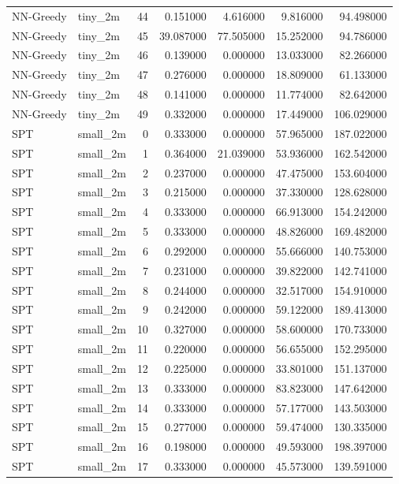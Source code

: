 \begin{tabular}{llrrrrr}
NN-Greedy & tiny_2m & 44 & 0.151000 & 4.616000 & 9.816000 & 94.498000 \\
NN-Greedy & tiny_2m & 45 & 39.087000 & 77.505000 & 15.252000 & 94.786000 \\
NN-Greedy & tiny_2m & 46 & 0.139000 & 0.000000 & 13.033000 & 82.266000 \\
NN-Greedy & tiny_2m & 47 & 0.276000 & 0.000000 & 18.809000 & 61.133000 \\
NN-Greedy & tiny_2m & 48 & 0.141000 & 0.000000 & 11.774000 & 82.642000 \\
NN-Greedy & tiny_2m & 49 & 0.332000 & 0.000000 & 17.449000 & 106.029000 \\
SPT & small_2m & 0 & 0.333000 & 0.000000 & 57.965000 & 187.022000 \\
SPT & small_2m & 1 & 0.364000 & 21.039000 & 53.936000 & 162.542000 \\
SPT & small_2m & 2 & 0.237000 & 0.000000 & 47.475000 & 153.604000 \\
SPT & small_2m & 3 & 0.215000 & 0.000000 & 37.330000 & 128.628000 \\
SPT & small_2m & 4 & 0.333000 & 0.000000 & 66.913000 & 154.242000 \\
SPT & small_2m & 5 & 0.333000 & 0.000000 & 48.826000 & 169.482000 \\
SPT & small_2m & 6 & 0.292000 & 0.000000 & 55.666000 & 140.753000 \\
SPT & small_2m & 7 & 0.231000 & 0.000000 & 39.822000 & 142.741000 \\
SPT & small_2m & 8 & 0.244000 & 0.000000 & 32.517000 & 154.910000 \\
SPT & small_2m & 9 & 0.242000 & 0.000000 & 59.122000 & 189.413000 \\
SPT & small_2m & 10 & 0.327000 & 0.000000 & 58.600000 & 170.733000 \\
SPT & small_2m & 11 & 0.220000 & 0.000000 & 56.655000 & 152.295000 \\
SPT & small_2m & 12 & 0.225000 & 0.000000 & 33.801000 & 151.137000 \\
SPT & small_2m & 13 & 0.333000 & 0.000000 & 83.823000 & 147.642000 \\
SPT & small_2m & 14 & 0.333000 & 0.000000 & 57.177000 & 143.503000 \\
SPT & small_2m & 15 & 0.277000 & 0.000000 & 59.474000 & 130.335000 \\
SPT & small_2m & 16 & 0.198000 & 0.000000 & 49.593000 & 198.397000 \\
SPT & small_2m & 17 & 0.333000 & 0.000000 & 45.573000 & 139.591000 \\

\end{tabular}
